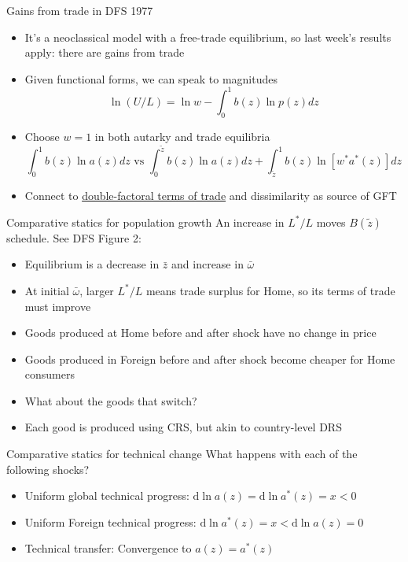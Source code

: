 \documentclass[10pt,notes=hide]{beamer}
\begin{document}
\begin{frame}{Gains from trade in DFS 1977}
\begin{itemize}
	\item It's a neoclassical model with a free-trade equilibrium,
	so last week's results apply: there are gains from trade
	\item Given functional forms, we can speak to magnitudes
	\begin{equation*}
		\ln (U/L) = {\ln w} - \int_{0}^{1} b(z) \ln p(z) dz
	\end{equation*}
	\item Choose $w=1$ in both autarky and trade equilibria
	\begin{equation*}
	 \int_{0}^{1} b(z) \ln a(z) dz \text{ vs } \int_{0}^{\tilde{z}} b(z) \ln a(z) dz + \int_{\tilde{z}}^{1} b(z) \ln \left[w^{*} a^{*}(z)\right] dz 
	\end{equation*}
	\item Connect to \href{http://www-personal.umich.edu/~alandear/glossary/d.html\#DoubleFactoralTermsOfTrade}{double-factoral terms of trade} and dissimilarity as source of GFT
\end{itemize}
\end{frame}
\begin{frame}{Comparative statics for population growth}
An increase in $L^{*}/L$ moves $B(\tilde{z})$ schedule. See DFS Figure 2:
\begin{itemize}
	\item Equilibrium is a decrease in $\bar{z}$ and increase in $\bar{\omega}$
	\item At initial $\bar{\omega}$, larger $L^{*}/L$ means trade surplus for Home, so its terms of trade must improve
	\item Goods produced at Home before and after shock have no change in price
	\item Goods produced in Foreign before and after shock become cheaper for Home consumers
	\item What about the goods that switch?
	\item Each good is produced using CRS, but akin to country-level DRS
\end{itemize}
\end{frame}
\begin{frame}{Comparative statics for technical change}
What happens with each of the following shocks?
\begin{itemize}
	\item Uniform global technical progress:  $\textrm{d}\ln a(z) = \textrm{d}\ln a^{*}(z) = x < 0$
	\item Uniform Foreign technical progress: $\textrm{d}\ln a^{*}(z) = x < \textrm{d}\ln a(z) = 0$
	\item Technical transfer: Convergence to $a(z) = a^{*}(z)$
\end{itemize}
\end{frame}
\end{document}

